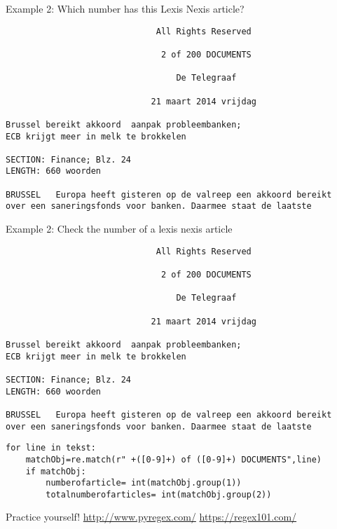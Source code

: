 \documentclass{beamer}
\begin{document}
\begin{frame}[fragile]{Example 2: Which number has this Lexis Nexis article?}
\begin{lstlisting}
                              All Rights Reserved

                               2 of 200 DOCUMENTS

                                  De Telegraaf

                             21 maart 2014 vrijdag

Brussel bereikt akkoord  aanpak probleembanken;
ECB krijgt meer in melk te brokkelen

SECTION: Finance; Blz. 24
LENGTH: 660 woorden

BRUSSEL   Europa heeft gisteren op de valreep een akkoord bereikt 
over een saneringsfonds voor banken. Daarmee staat de laatste
\end{lstlisting}

\end{frame}

\begin{frame}[fragile]{Example 2: Check the number of a lexis nexis article}
\begin{lstlisting}
                              All Rights Reserved

                               2 of 200 DOCUMENTS

                                  De Telegraaf

                             21 maart 2014 vrijdag

Brussel bereikt akkoord  aanpak probleembanken;
ECB krijgt meer in melk te brokkelen

SECTION: Finance; Blz. 24
LENGTH: 660 woorden

BRUSSEL   Europa heeft gisteren op de valreep een akkoord bereikt 
over een saneringsfonds voor banken. Daarmee staat de laatste
\end{lstlisting}

\begin{lstlisting}
for line in tekst:
    matchObj=re.match(r" +([0-9]+) of ([0-9]+) DOCUMENTS",line)
    if matchObj:
        numberofarticle= int(matchObj.group(1))
        totalnumberofarticles= int(matchObj.group(2))
\end{lstlisting}
\end{frame}


\begin{frame}{Practice yourself!}
\huge{\url{http://www.pyregex.com/}}
\huge{\url{https://regex101.com/}}
\end{frame}
\end{document}
